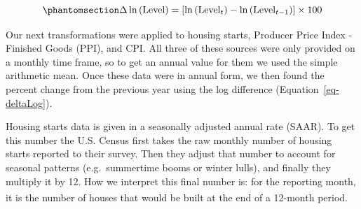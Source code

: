 \documentclass[10pt, letterpaper]{article}
\begin{document}
\begin{equation}\phantomsection\label{eq-deltaLog}{
\Delta\ln{(\text{Level})} = 
[\ln{(\text{Level}_{t})} - \ln{(\text{Level}_{t-1})}] \times 100
}\end{equation}

Our next transformations were applied to housing starts, Producer Price
Index - Finished Goods (PPI), and CPI. All three of these sources were
only provided on a monthly time frame, so to get an annual value for
them we used the simple arithmetic mean. Once these data were in annual
form, we then found the percent change from the previous year using the
log difference (Equation~\ref{eq-deltaLog}).

Housing starts data is given in a seasonally adjusted annual rate
(SAAR). To get this number the U.S. Census first takes the raw monthly
number of housing starts reported to their survey. Then they adjust that
number to account for seasonal patterns (e.g.~summertime booms or winter
lulls), and finally they multiply it by 12. How we interpret this final
number is: for the reporting month, it is the number of houses that
would be built at the end of a 12-month
period.\textsuperscript{}
\end{document}
